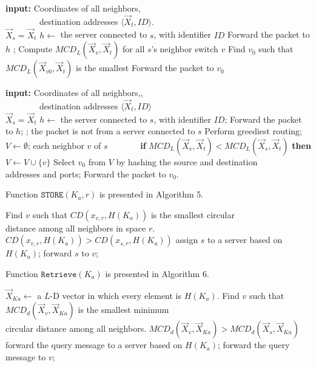 \documentclass[10pt,conference]{IEEEtran}
\begin{document}
\begin{appendix}
\begin{codebox}
\textbf{input:} Coordinates of all neighbors,\\ \ \ \ \ \ \ \ \  destination addresses $\langle \vec{X}_{t}, ID \rangle$.  \\
\li \If $\vec{X}_{s} = \vec{X}_{t}$
\li \Then $h \gets$ the server connected to $s$, with identifier $ID$
\li    Forward the packet to $h$
\li  \Return; \End
\li Compute $MCD_L(\vec{X}_v,\vec{X}_t)$ for all $s$'s neighbor switch $v$
\li Find $v_0$ such that $MCD_L(\vec{X}_{v0},\vec{X}_t)$ is the smallest
\li Forward the packet to $v_0$
\End
\end{codebox}

\begin{codebox}
\textbf{input:} Coordinates of all neighbors,,\\ \ \ \ \ \ \ \ \ destination addresses $\langle \vec{X}_{t}, ID \rangle$  \\
\li \If $\vec{X}_{s} = \vec{X}_{t}$
\li \Then $h \gets$ the server connected to $s$, with identifier $ID$;
\li    Forward the packet to $h$;
\li  \Return; \End
\li \If the packet is not from a server connected to $s$
\li \Then Perform greediest routing;
\li \Return \End
\li $V \gets \emptyset$;
\li \For each neighbor $v$ of $s$
\li \ \ \ \ \ \ \ \textbf{if} $MCD_L(\vec{X}_v,\vec{X}_t) < MCD_L(\vec{X}_s, \vec{X}_t)$ \textbf{then} $V \gets V \cup \{v\} $
\li Select $v_0$ from $V$ by hashing the source and destination\\ addresses and ports;
\li Forward the packet to $v_0$. \End
\end{codebox}

\iffalse
Function $\mathtt{STORE}(K_a, r)$ is presented in Algorithm 5.
\begin{codebox}
\li Find $v$ such that $CD(x_{v,r},H(K_a))$ is the smallest circular\\ distance among all neighbors in space $r$.
\li \If $CD(x_{v,r},H(K_a)) > CD(x_{s,r},H(K_a))$
\li \Then assign $s$ to a server based on $H(K_a)$;\End
\li \Else forward $s$ to $v$;\End
\end{codebox}


Function $\mathtt{Retrieve}(K_a)$ is presented in Algorithm 6.

\begin{codebox}
\li $\vec{X}_{Ka} \gets$ a $L$-D vector in which every element is $H(K_a)$.
\li Find $v$ such that $MCD_d(\vec{X}_v, \vec{X}_{Ka})$ is the smallest minimum\\ circular distance among all neighbors.
\li \If $MCD_d(\vec{X}_v, \vec{X}_{Ka}) > MCD_d(\vec{X}_s, \vec{X}_{Ka})$
\li \Then forward the query message to a server based on $H(K_a)$;\End
\li \Else forward the query message to $v$;\End
\end{codebox}


\end{appendix}
\end{document}
